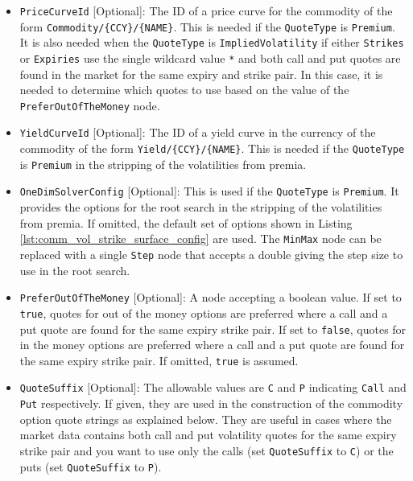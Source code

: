 \begin{itemize}
\item \lstinline!PriceCurveId! [Optional]:
The ID of a price curve for the commodity of the form \lstinline!Commodity/{CCY}/{NAME}!. This is needed if the \lstinline!QuoteType! is \lstinline!Premium!. It is also needed when the \lstinline!QuoteType! is \lstinline!ImpliedVolatility! if either \lstinline!Strikes! or \lstinline!Expiries! use the single wildcard value \lstinline!*! and both call and put quotes are found in the market for the same expiry and strike pair. In this case, it is needed to determine which quotes to use based on the value of the \lstinline!PreferOutOfTheMoney! node.

\item \lstinline!YieldCurveId! [Optional]:
The ID of a yield curve in the currency of the commodity of the form \lstinline!Yield/{CCY}/{NAME}!. This is needed if the \lstinline!QuoteType! is \lstinline!Premium! in the stripping of the volatilities from premia.

\item \lstinline!OneDimSolverConfig! [Optional]:
This is used if the \lstinline!QuoteType! is \lstinline!Premium!. It provides the options for the root search in the stripping of the volatilities from premia. If omitted, the default set of options shown in Listing \ref{lst:comm_vol_strike_surface_config} are used. The \lstinline!MinMax! node can be replaced with a single \lstinline!Step! node that accepts a double giving the step size to use in the root search.

\item \lstinline!PreferOutOfTheMoney! [Optional]:
A node accepting a boolean value. If set to \lstinline!true!, quotes for out of the money options are preferred where a call and a put quote are found for the same expiry strike pair. If set to \lstinline!false!, quotes for in the money options are preferred where a call and a put quote are found for the same expiry strike pair. If omitted, \lstinline!true! is assumed.

\item \lstinline!QuoteSuffix! [Optional]:
The allowable values are \lstinline!C! and \lstinline!P! indicating \lstinline!Call! and \lstinline!Put! respectively. If given, they are used in the construction of the commodity option quote strings as explained below. They are useful in cases where the market data contains both call and put volatility quotes for the same expiry strike pair and you want to use only the calls (set \lstinline!QuoteSuffix! to \lstinline!C!) or the puts (set \lstinline!QuoteSuffix! to \lstinline!P!).

\end{itemize}


